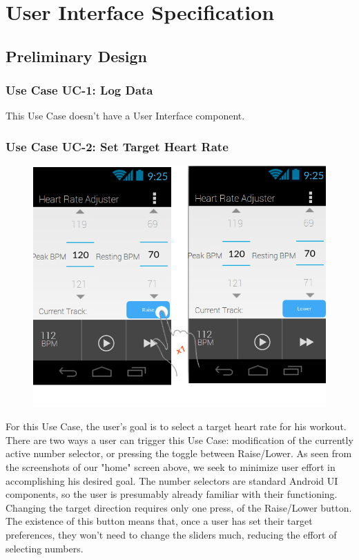 \documentclass[letterpaper,english, 12pt]{scrreprt}
\begin{document}
\chapter{User Interface Specification}
\section{Preliminary Design}

\subsection{Use Case UC-1: Log Data}
This Use Case doesn't have a User Interface component.

\subsection{Use Case UC-2: Set Target Heart Rate}

\begin{figure}[H]
	\centering
	\includegraphics{img/Prelim_Design/PrelimDesign_1.png}\\
\end{figure}

For this Use Case, the user's goal is to select a target heart rate for his workout.
There are two ways a user can trigger this Use Case: modification of the currently active number selector, or pressing the toggle between Raise/Lower.
As seen from the screenshots of our "home" screen above, we seek to minimize user effort in accomplishing his desired goal.
The number selectors are standard Android UI components, so the user is presumably already familiar with their functioning.
Changing the target direction requires only one press, of the Raise/Lower button.
The existence of this button means that, once a user has set their target preferences, they won't need to change the sliders much, reducing the effort of selecting numbers.\\
\end{document}
